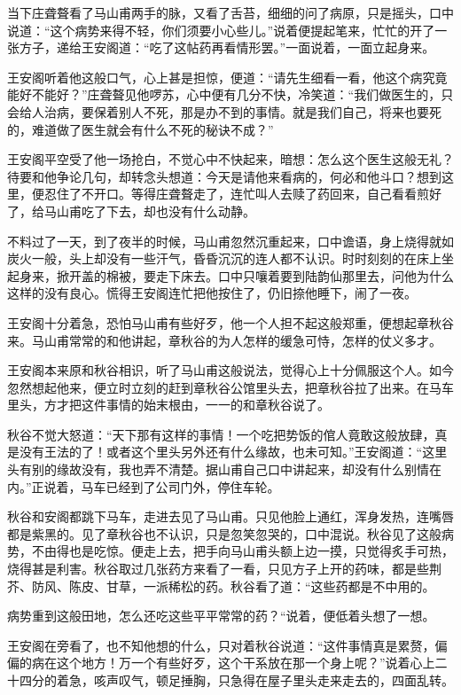 \documentclass[12pt,UTF8]{ctexbook}
\begin{document}
{{{当下庄聋聱看了马山甫两手的脉，又看了舌苔，细细的问了病原，只是摇头，口中说道：“这个病势来得不轻，你们须要小心些儿。”说着便提起笔来，忙忙的开了一张方子，递给王安阁道：“吃了这帖药再看情形罢。”一面说着，一面立起身来。

王安阁听着他这般口气，心上甚是担惊，便道：“请先生细看一看，他这个病究竟能好不能好？”庄聋聱见他啰苏，心中便有几分不快，冷笑道：“我们做医生的，只会给人治病，要保着别人不死，那是办不到的事情。就是我们自己，将来也要死的，难道做了医生就会有什么不死的秘诀不成？”

王安阁平空受了他一场抢白，不觉心中不快起来，暗想：怎么这个医生这般无礼？待要和他争论几句，却转念头想道：今天是请他来看病的，何必和他斗口？想到这里，便忍住了不开口。等得庄聋聱走了，连忙叫人去赎了药回来，自己看看煎好了，给马山甫吃了下去，却也没有什么动静。

不料过了一天，到了夜半的时候，马山甫忽然沉重起来，口中谵语，身上烧得就如炭火一般，头上却没有一些汗气，昏昏沉沉的连人都不认识。时时刻刻的在床上坐起身来，掀开盖的棉被，要走下床去。口中只嚷着要到陆韵仙那里去，问他为什么这样的没有良心。慌得王安阁连忙把他按住了，仍旧捺他睡下，闹了一夜。

王安阁十分着急，恐怕马山甫有些好歹，他一个人担不起这般郑重，便想起章秋谷来。马山甫常常的和他讲起，章秋谷的为人怎样的缓急可恃，怎样的仗义多才。

王安阁本来原和秋谷相识，听了马山甫这般说法，觉得心上十分佩服这个人。如今忽然想起他来，便立时立刻的赶到章秋谷公馆里头去，把章秋谷拉了出来。在马车里头，方才把这件事情的始末根由，一一的和章秋谷说了。

秋谷不觉大怒道：“天下那有这样的事情！一个吃把势饭的倌人竟敢这般放肆，真是没有王法的了！或者这个里头另外还有什么缘故，也未可知。”王安阁道：“这里头有别的缘故没有，我也弄不清楚。据山甫自己口中讲起来，却没有什么别情在内。”正说着，马车已经到了公司门外，停住车轮。

秋谷和安阁都跳下马车，走进去见了马山甫。只见他脸上通红，浑身发热，连嘴唇都是紫黑的。见了章秋谷也不认识，只是忽笑忽哭的，口中混说。秋谷见了这般病势，不由得也是吃惊。便走上去，把手向马山甫头额上边一摸，只觉得炙手可热，烧得甚是利害。秋谷取过几张药方来看了一看，只见方子上开的药味，都是些荆芥、防风、陈皮、甘草，一派稀松的药。秋谷看了道：“这些药都是不中用的。

病势重到这般田地，怎么还吃这些平平常常的药？“说着，便低着头想了一想。

王安阁在旁看了，也不知他想的什么，只对着秋谷说道：“这件事情真是累赘，偏偏的病在这个地方！万一个有些好歹，这个干系放在那一个身上呢？”说着心上二十四分的着急，咳声叹气，顿足捶胸，只急得在屋子里头走来走去的，四面乱转。

}}}
\end{document}
